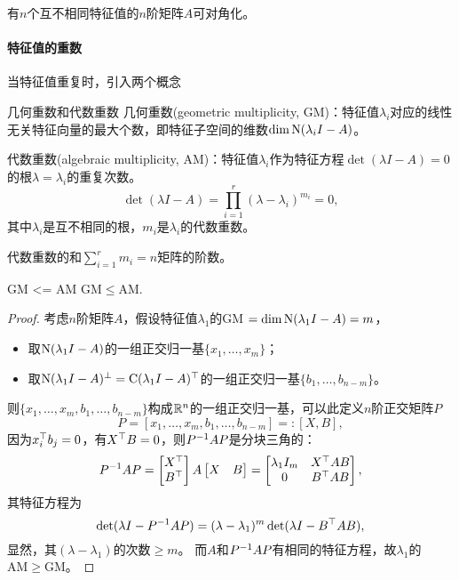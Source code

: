 \begin{corollary}
	有$n$个互不相同特征值的$n$阶矩阵$A$可对角化。
\end{corollary}

\paragraph{特征值的重数}

当特征值重复时，引入两个概念

\newcommand*{\GM}{\mathrm{GM}}
\newcommand*{\AM}{\mathrm{AM}}

\begin{definition}{几何重数和代数重数}{}
	几何重数(geometric multiplicity, GM)：特征值$\lambda_i$对应的线性无关特征向量的最大个数，即特征子空间的维数$\dim\operatorname{N}(\lambda_iI-A)$。

	代数重数(algebraic multiplicity, AM)：特征值$\lambda_i$作为特征方程$\det(\lambda I-A)=0$的根$\lambda=\lambda_i$的重复次数。
	\[
		\det(\lambda I-A)=\prod_{i=1}^r(\lambda-\lambda_i)^{m_i}=0,
	\]
	其中$\lambda_i$是互不相同的根，$m_i$是$\lambda_i$的代数重数。
\end{definition}

\begin{corollary}
	代数重数的和$\textstyle\sum_{i=1}^rm_i=n$矩阵的阶数。
\end{corollary}

\begin{theorem}{}{GM <= AM}
	$\GM\leqslant\AM.$
\end{theorem}
\begin{proof}
	考虑$n$阶矩阵$A$，假设特征值$\lambda_1$的GM $=\dim\operatorname{N}(\lambda_1I-A)=m$，
	\begin{itemize}
		\item 取$\operatorname{N}(\lambda_1I-A)$的一组正交归一基$\{x_1,\ldots,x_m\}$；
		\item 取$\operatorname{N}(\lambda_1I-A)^\perp=\operatorname{C}(\lambda_1I-A)^\top$的一组正交归一基$\{b_1,\ldots,b_{n-m}\}$。
	\end{itemize}
	则$\{x_1,\ldots,x_m,b_1,\ldots,b_{n-m}\}$构成$\mathbb R^n$的一组正交归一基，可以此定义$n$阶正交矩阵$P$ 
	\[
		P=[x_1,\ldots,x_m,b_1,\ldots,b_{n-m}]=:[X,B],
	\]
	因为$x_i^\top b_j=0$，有$X^\top B=0$，则$P^{-1} AP$是分块三角的：
	\[
		P^{-1} AP=\begin{bmatrix}
			X^\top\\B^\top
		\end{bmatrix}A\begin{bmatrix}
			X&B
		\end{bmatrix}=\begin{bmatrix}
			\lambda_1I_m&X^\top AB\\0&B^\top AB
		\end{bmatrix},
	\]
	其特征方程为
	\[
		\det(\lambda I-P^{-1} AP)=(\lambda-\lambda_1)^m\det(\lambda I-B^\top AB),
	\]
	显然，其$(\lambda-\lambda_1)$的次数$\geq m$。
	而$A$和$P^{-1} AP$有相同的特征方程，故$\lambda_1$的$\AM\geqslant\GM$。
\end{proof}

